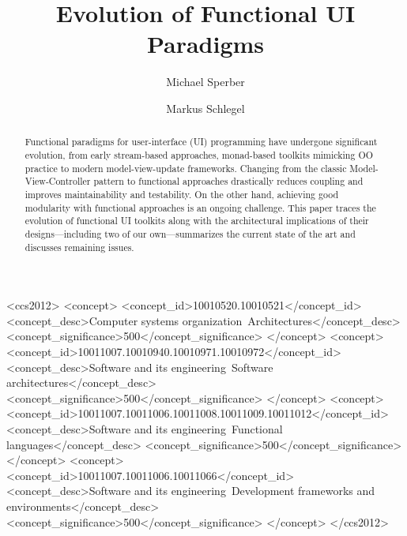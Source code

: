 \documentclass[sigplan,screen]{acmart}
\begin{document}
\title{Evolution of Functional UI Paradigms}

\author{Michael Sperber}

\author{Markus Schlegel}

\begin{abstract}
  Functional paradigms for user-interface (UI) programming have
  undergone significant evolution, from early
  stream-based approaches, monad-based toolkits mimicking OO practice
  to modern model-view-update frameworks.  Changing from the
  classic Model-View-Controller pattern to
  functional approaches 
  drastically reduces coupling and improves maintainability and
  testability.  On the other hand, achieving good modularity with
  functional approaches is an ongoing challenge.  This paper traces
  the evolution of functional UI toolkits along with the architectural
  implications of their designs---including two of our own---summarizes
  the current state of the art and discusses remaining issues.
\end{abstract}

\begin{CCSXML}
<ccs2012>
   <concept>
       <concept_id>10010520.10010521</concept_id>
       <concept_desc>Computer systems organization~Architectures</concept_desc>
       <concept_significance>500</concept_significance>
       </concept>
   <concept>
       <concept_id>10011007.10010940.10010971.10010972</concept_id>
       <concept_desc>Software and its engineering~Software architectures</concept_desc>
       <concept_significance>500</concept_significance>
       </concept>
   <concept>
       <concept_id>10011007.10011006.10011008.10011009.10011012</concept_id>
       <concept_desc>Software and its engineering~Functional languages</concept_desc>
       <concept_significance>500</concept_significance>
       </concept>
    <concept>
        <concept_id>10011007.10011006.10011066</concept_id>
        <concept_desc>Software and its engineering~Development frameworks and environments</concept_desc>
        <concept_significance>500</concept_significance>
    </concept>
</ccs2012>
\end{CCSXML}
\end{document}
